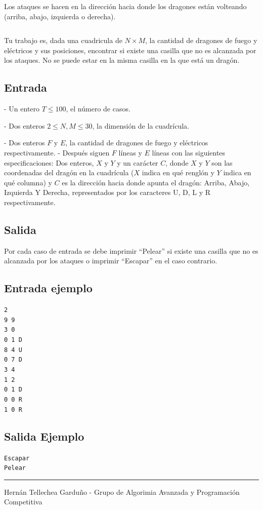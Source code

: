 \documentclass[letter,10pt]{article}
\newcommand{\lyxaddress}[1]{
\par {\raggedright #1
\vspace{1.4em}
\noindent\par}
}
\begin{document}
Los ataques se hacen en la dirección hacia donde los dragones están volteando (arriba, abajo, izquierda o derecha).

$$$$
$$$$
$$$$

Tu trabajo es, dada una cuadricula de $N \times M$, la cantidad de dragones de fuego y eléctricos y sus posiciones, encontrar si existe una casilla que no es alcanzada por los ataques. No se puede estar en la misma casilla en la que está un dragón.
\bigskip
\subsection*{Entrada}

- Un entero $T \leq 100$, el número de casos.

- Dos enteros $2 \leq N,M \leq 30$, la dimensión de la cuadrícula.

- Dos enteros $F$ y $E$, la cantidad de dragones de fuego y eléctricos respectivamente.
- Después siguen $F$ líneas y $E$ líneas con las siguientes especificaciones: Dos enteros, $X$ y $Y$ y un carácter $C$, donde $X$ y $Y$ son las coordenadas del dragón en la cuadrícula ($X$ indica en qué renglón y $Y$ indica en qué columna) y $C$ es la dirección hacia donde apunta el dragón: Arriba, Abajo, Izquierda Y Derecha, representados por los caracteres U, D, L y R respectivamente.

\subsection*{Salida}

Por cada caso de entrada se debe imprimir ``Pelear'' si existe una casilla que no es alcanzada por los ataques o imprimir ``Escapar'' en el caso contrario.

\subsection*{Entrada ejemplo}
\noindent \texttt{2}~\\
\texttt{9 9}~\\
\texttt{3 0}~\\
\texttt{0 1 D}~\\
\texttt{8 4 U}~\\
\texttt{0 7 D}~\\
\texttt{3 4}~\\
\texttt{1 2}~\\
\texttt{0 1 D}~\\
\texttt{0 0 R}~\\
\texttt{1 0 R}~\\
\noindent 

\subsection*{Salida Ejemplo}

\noindent \texttt{Escapar}~\\
\texttt{Pelear}~\\

\noindent \rule[0.5ex]{1\columnwidth}{1pt}


\lyxaddress{Hernán Tellechea Garduño - Grupo de Algorimia Avanzada y Programación Competitiva}
\end{document}

